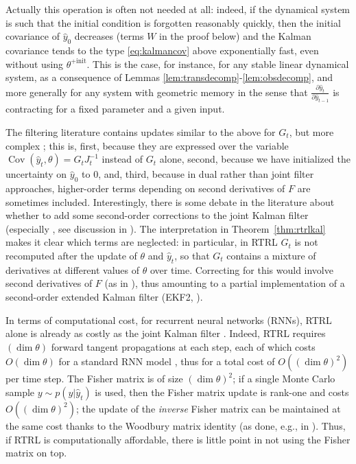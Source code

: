 \documentclass[11pt,a4paper]{article}
\DeclareMathOperator{\Cov}{Cov}
\newcommand{\1}{\mathbbm{1}}
\theoremstyle{yannthm}
\theoremstyle{yannthm2}
\numberwithin{equation}{section}
\begin{document}
Actually this operation is often not needed at all: indeed, if the dynamical
system is such that the initial condition is forgotten reasonably
quickly, then the initial covariance of $\hat y_0$ decreases (terms $W$
in the proof below) and the Kalman covariance tends to the type
\eqref{eq:kalmancov} above exponentially fast, even without using
$\theta^{+\mathrm{init}}$. This is the case, for
instance, for any stable linear dynamical system, as a consequence of
Lemmas \ref{lem:transdecomp}-\ref{lem:obsdecomp}, and more generally for
any system with geometric memory in the sense that $\frac{\partial \hat
y_{t}}{\partial \hat y_{t-1}}$ is contracting for a fixed parameter and a
given input.

The filtering literature contains updates similar to the above for $G_t$, but more
complex \cite{ljung83,Haykin_book}; this is, first, because they are
expressed over the variable $\Cov(\hat y_t,\theta)=G_tJ_t^{-1}$ instead
of $G_t$ alone, second, because we have initialized the uncertainty on
$\hat y_0$ to $0$, and, third, because in dual rather than joint filter
approaches, higher-order terms depending on second derivatives of $F$ are
sometimes included.  Interestingly, there is some debate in the
literature about whether to add some second-order corrections to the joint Kalman
filter (especially \cite[\S2.3.3]{ljung83}, see discussion in
\cite[\S5.3.4]{Haykin_book}). The interpretation in
Theorem~\ref{thm:rtrlkal}
makes it clear which terms are neglected:
in particular, in RTRL $G_t$ is not recomputed after the update of $\theta$ and
$\hat y_t$, so that
$G_t$ contains a mixture of derivatives at different values of $\theta$
over time. Correcting for this would involve second derivatives of $F$ (as
in \cite[\S5, Appendix A]{Haykin_book}), thus amounting to a partial
implementation of a second-order extended Kalman filter (EKF2,
\cite[\S13.3]{simon2006kalmanbook}).

In terms of computational cost, for recurrent neural networks (RNNs),
RTRL alone is already as costly as the joint Kalman filter \cite{williams1992training}.  Indeed, RTRL requires $(\dim \theta)$ forward tangent
propagations at each step, each of which costs $O(\dim \theta)$ for a
standard RNN model \cite{Jaeger_tutorial}, thus for a total cost of
$O((\dim\theta)^2)$ per time step. The Fisher matrix is of size
$(\dim\theta)^2$; if a single Monte Carlo sample $y\sim p(y|\hat y_t)$ is
used, then the Fisher matrix update is rank-one and costs
$O((\dim\theta)^2)$; the update of the \emph{inverse} Fisher matrix can
be maintained at the same cost thanks to the Woodbury matrix identity
(as done, e.g., in \cite{TONGA}). Thus, if RTRL is computationally
affordable, there is little point in not using the Fisher matrix on top.
\end{document}
